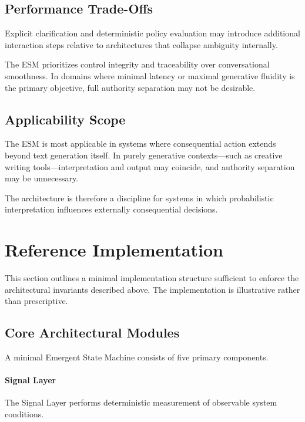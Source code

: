 \documentclass[11pt]{article}
\begin{document}
\subsection{Performance Trade-Offs}

Explicit clarification and deterministic policy evaluation may introduce additional interaction steps relative to architectures that collapse ambiguity internally.

The ESM prioritizes control integrity and traceability over conversational smoothness. In domains where minimal latency or maximal generative fluidity is the primary objective, full authority separation may not be desirable.

\subsection{Applicability Scope}

The ESM is most applicable in systems where consequential action extends beyond text generation itself. In purely generative contexts—such as creative writing tools—interpretation and output may coincide, and authority separation may be unnecessary.

The architecture is therefore a discipline for systems in which probabilistic interpretation influences externally consequential decisions.



\section{Reference Implementation}

This section outlines a minimal implementation structure sufficient to enforce the architectural invariants described above. The implementation is illustrative rather than prescriptive.

\subsection{Core Architectural Modules}

A minimal Emergent State Machine consists of five primary components.

\paragraph{Signal Layer}

The Signal Layer performs deterministic measurement of observable system conditions.
\end{document}

